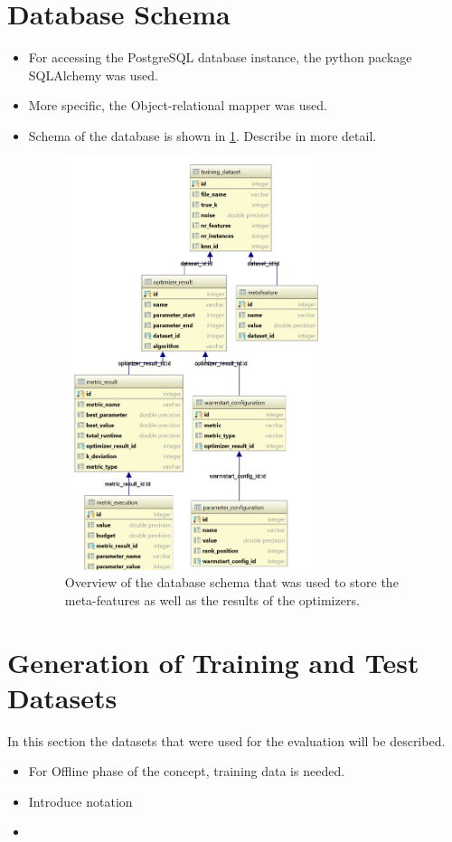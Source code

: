 \section{Database Schema}
\begin{itemize}
    \item For accessing the PostgreSQL database instance, the python package SQLAlchemy \cite{sqlalchemy} was used.
    \item More specific, the Object-relational mapper was used.
    \item Schema of the database is shown in \cref{fig:dbschema}.
    Describe in more detail.
    \begin{figure}
        \centering
        \includegraphics[width=0.7\textwidth]{graphics/database_schema.png}
        \caption{Overview of the database schema that was used to store the meta-features as well as the results of the optimizers.}
        \label{fig:dbschema}
    \end{figure}
    
\end{itemize}

\section{Generation of Training and Test Datasets}

In this section the datasets that were used for the evaluation will be described.
\begin{itemize}
    \item For Offline phase of the concept, training data is needed.
    \item Introduce notation
    \item 
\end{itemize}


